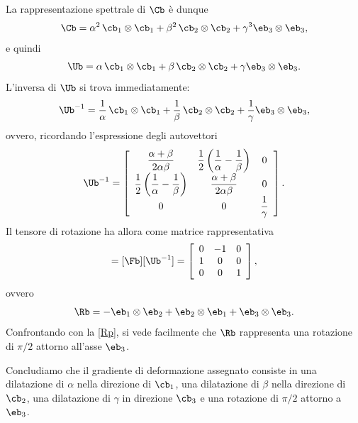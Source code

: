 \begin{exercise}
\begin{svolgimento}
La rappresentazione spettrale di $\Cb$ è dunque
\begin{equation}
\Cb=\alpha^2 \, \cb_1\otimes\cb_1+\beta^2 \, \cb_2\otimes\cb_2+\gamma^3\eb_3\otimes\eb_3,
\end{equation}
e quindi
\begin{equation}
	\Ub=\alpha \, \cb_1\otimes\cb_1+\beta \, \cb_2\otimes\cb_2+\gamma\eb_3\otimes\eb_3.
\end{equation}
L'inversa di $\Ub$ si trova immediatamente:
\begin{equation}
\Ub^{-1}=\frac{1}{\alpha} \, \cb_1\otimes\cb_1+\frac{1}{\beta} \, \cb_2\otimes\cb_2+\frac{1}{\gamma} \eb_3\otimes\eb_3,
\end{equation}
ovvero, ricordando l'espressione degli autovettori
\begin{equation}
\Ub^{-1}=\left[
\begin{array}{ccc}
	\dfrac{\alpha +\beta }{2 \alpha  \beta } & \dfrac{1}{2} \left(\dfrac{1}{\alpha
	}-\dfrac{1}{\beta }\right) & 0 \\[.2cm]
	\dfrac{1}{2} \left(\dfrac{1}{\alpha }-\dfrac{1}{\beta }\right) & \dfrac{\alpha +\beta }{2
		\alpha  \beta } & 0 \\[.2cm]
	0 & 0 & \dfrac{1}{\gamma } \\
\end{array}
\right].
\end{equation}
Il tensore di rotazione ha allora come matrice rappresentativa
\begin{equation}
[\Rb]=[\Fb][\Ub^{-1}]=\left[
\begin{array}{ccc}
	0 & -1 & 0 \\
	1 & 0 & 0 \\
	0 & 0 & 1 \\
\end{array}
\right],
\end{equation}
ovvero 
\begin{equation}
	\Rb=-\eb_1\otimes\eb_2+\eb_2\otimes\eb_1+\eb_{3}\otimes\eb_{3}.
\end{equation}
Confrontando con la \eqref{Rp}, si vede facilmente che $\Rb$ rappresenta una rotazione di $\pi/2$ attorno all'asse $\eb_3$. 

	Concludiamo che il gradiente di deformazione assegnato consiste in una dilatazione di $\alpha$ nella direzione di $\cb_1$, una dilatazione di $\beta$ nella direzione di $\cb_2$, una dilatazione di $\gamma$ in direzione $\cb_3$ e una rotazione di $\pi/2$ attorno a $\eb_3$.
\end{svolgimento}
\end{exercise}


